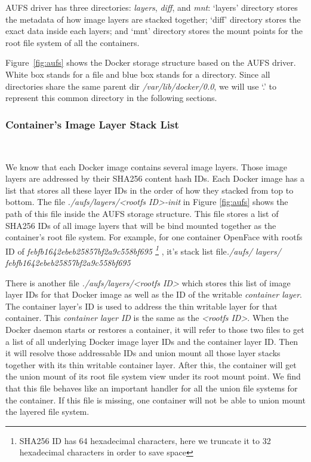 AUFS driver has three directories: \textit{layers}, \textit{diff}, and \textit{mnt}: `layers' directory stores the metadata of how image layers are stacked together; `diff' directory stores the exact data inside each layers; and `mnt' directory stores the mount points for the root file system of all the containers. 



Figure~\ref{fig:aufs} shows the Docker storage structure based on the AUFS driver. White box stands for a file and blue box stands for a directory. Since all directories share the same parent dir \textit{/var/lib/docker/0.0}, we will use `.' to represent this common directory in the following sections. 


\smallbreak
\subsubsection{Container's Image Layer Stack List}
~\smallbreak

We know that each Docker image contains several image layers. Those image layers are addressed by their SHA256 content hash IDs. Each Docker image has a list that stores all these layer IDs in the order of how they stacked from top to bottom.
The file \textit{./aufs/layers/<rootfs ID>-init}  in Figure \ref{fig:aufs} shows the path of this file inside the AUFS storage structure. This file stores a list of SHA256 IDs of all image layers that will be bind mounted together as the container's root file system. For example, for one container OpenFace with rootfs ID of 
\textit{
febfb1642ebeb25857bf2a9c558bf695
\footnote{SHA256 ID has 64 hexadecimal characters, here we truncate it to 32 hexadecimal characters in order to save space}
}, it's stack list file\textit{./aufs/ layers/ febfb1642ebeb25857bf2a9c558bf695}

There is another file \textit{./aufs/layers/<rootfs ID>} which stores this list of image layer IDs for that Docker image as well as the ID of the writable \textit{container layer}.  The container layer's ID is used to address the thin writable layer for that container. This \textit{container layer ID} is the same as the \textit{<rootfs ID>}. 
When the Docker daemon starts or restores a container, it will refer to those two files to get a list of all underlying Docker image layer IDs and the container layer ID. Then it will resolve those addressable IDs and union mount all those layer stacks together with its thin writable container layer. After this, the container will get the union mount of its root file system view under its root mount point. 
We find that this file behaves like an important handler for all the union file systems for the container. If this file is missing, one container will not be able to union mount the layered file system.

